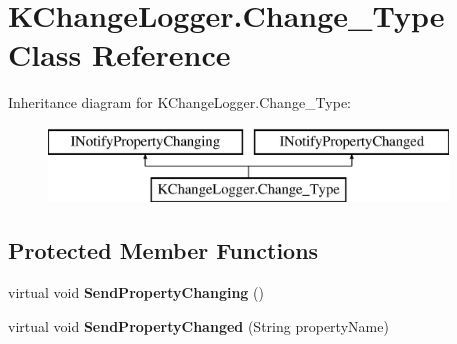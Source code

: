 \hypertarget{class_k_change_logger_1_1_change___type}{\section{K\-Change\-Logger.\-Change\-\_\-\-Type Class Reference}
\label{class_k_change_logger_1_1_change___type}
}
Inheritance diagram for K\-Change\-Logger.\-Change\-\_\-\-Type\-:\begin{figure}[H]
\begin{center}
\leavevmode
\includegraphics[height=2.000000cm]{class_k_change_logger_1_1_change___type}
\end{center}
\end{figure}
\subsection*{Protected Member Functions}
\begin{DoxyCompactItemize}
\item 
\hypertarget{class_k_change_logger_1_1_change___type_a7b5a2af06653680c347150dab7388767}{virtual void {\bfseries Send\-Property\-Changing} ()}\label{class_k_change_logger_1_1_change___type_a7b5a2af06653680c347150dab7388767}

\item 
\hypertarget{class_k_change_logger_1_1_change___type_a9df8bc15e525292e02580d4888badd0a}{virtual void {\bfseries Send\-Property\-Changed} (String property\-Name)}\label{class_k_change_logger_1_1_change___type_a9df8bc15e525292e02580d4888badd0a}

\end{DoxyCompactItemize}
